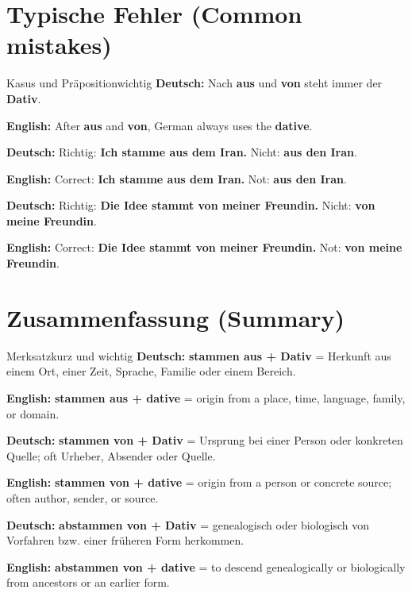 \documentclass[a4paper,11pt]{article}
\newcommand{\GermanText}[1]{\textbf{Deutsch: }#1\par}
\newcommand{\EnglishText}[1]{{\small\color{SoftGray}\textbf{English: }#1\par}}
\begin{document}
\section{Typische Fehler \textnormal{(Common mistakes)}}
\begin{grammarentry}{Kasus und Präposition}{wichtig}
\GermanText{Nach \textbf{aus} und \textbf{von} steht immer der \textbf{Dativ}.}
\EnglishText{After \textbf{aus} and \textbf{von}, German always uses the \textbf{dative}.}
\GermanText{Richtig: \textbf{Ich stamme aus dem Iran.} Nicht: \textbf{aus den Iran}.}
\EnglishText{Correct: \textbf{Ich stamme aus dem Iran.} Not: \textbf{aus den Iran}.}
\GermanText{Richtig: \textbf{Die Idee stammt von meiner Freundin.} Nicht: \textbf{von meine Freundin}.}
\EnglishText{Correct: \textbf{Die Idee stammt von meiner Freundin.} Not: \textbf{von meine Freundin}.}
\end{grammarentry}

\section{Zusammenfassung \textnormal{(Summary)}}
\begin{grammarentry}{Merksatz}{kurz und wichtig}
\GermanText{\textbf{stammen aus + Dativ} = Herkunft aus einem Ort, einer Zeit, Sprache, Familie oder einem Bereich.}
\EnglishText{\textbf{stammen aus + dative} = origin from a place, time, language, family, or domain.}
\GermanText{\textbf{stammen von + Dativ} = Ursprung bei einer Person oder konkreten Quelle; oft Urheber, Absender oder Quelle.}
\EnglishText{\textbf{stammen von + dative} = origin from a person or concrete source; often author, sender, or source.}
\GermanText{\textbf{abstammen von + Dativ} = genealogisch oder biologisch von Vorfahren bzw. einer früheren Form herkommen.}
\EnglishText{\textbf{abstammen von + dative} = to descend genealogically or biologically from ancestors or an earlier form.}
\end{grammarentry}
\end{document}
